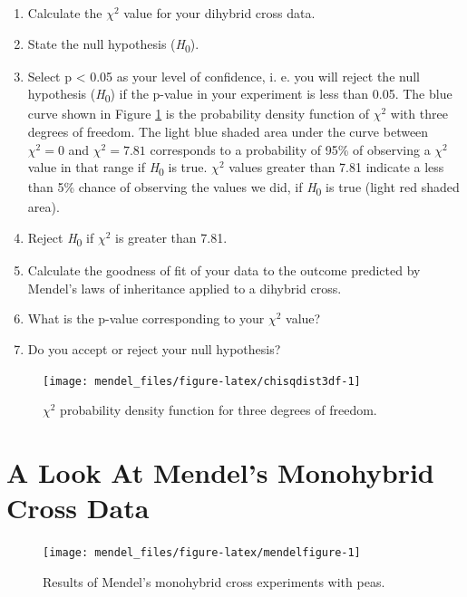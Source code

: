 \documentclass[]{book}
\providecommand{\tightlist}{%
  \setlength{\itemsep}{0pt}\setlength{\parskip}{0pt}}
\begin{document}
\begin{enumerate}
\def\labelenumi{\arabic{enumi}.}
\tightlist
\item
  Calculate the \(\chi^2\) value for your dihybrid cross data.
\item
  State the null hypothesis (\emph{H}\textsubscript{0}).
\item
  Select p \textless{} 0.05 as your level of confidence, i. e. you will reject the null hypothesis (\emph{H}\textsubscript{0}) if the p-value in your experiment is less than 0.05. The blue curve shown in Figure \ref{fig:chisqdist3df} is the probability density function of \(\chi^2\) with three degrees of freedom. The light blue shaded area under the curve between \(\chi^2=0\) and \(\chi^2=7.81\) corresponds to a probability of 95\% of observing a \(\chi^2\) value in that range if \emph{H}\textsubscript{0} is true. \(\chi^2\) values greater than 7.81 indicate a less than 5\% chance of observing the values we did, if \emph{H}\textsubscript{0} is true (light red shaded area).
\item
  Reject \emph{H}\textsubscript{0} if \(\chi^2\) is greater than 7.81.
\item
  Calculate the goodness of fit of your data to the outcome predicted by Mendel's laws of inheritance applied to a dihybrid cross.
\item
  What is the p-value corresponding to your \(\chi^2\) value?
\item
  Do you accept or reject your null hypothesis?
\end{enumerate}

\begin{figure}

{\centering \texttt{[image: mendel\_files/figure-latex/chisqdist3df-1]} 

}

\caption{\(\chi^2\) probability density function for three degrees of freedom.}\label{fig:chisqdist3df}
\end{figure}



\hypertarget{a-look-at-mendels-monohybrid-cross-data}{%
\section{A Look At Mendel's Monohybrid Cross Data}\label{a-look-at-mendels-monohybrid-cross-data}}



\begin{figure}

{\centering \texttt{[image: mendel\_files/figure-latex/mendelfigure-1]} 

}

\caption{Results of Mendel's monohybrid cross experiments with peas.}\label{fig:mendelfigure}
\end{figure}
\end{document}
